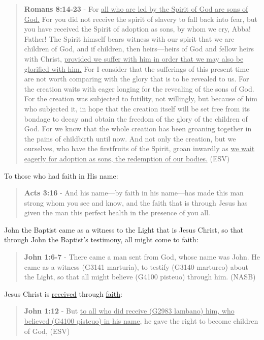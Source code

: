 \documentclass[11pt]{article}
\begin{document}
\begin{quote}
\textbf{Romans 8:14-23} - For \uline{all who are led by the Spirit of God are sons of God.} For you did not receive the spirit of slavery to fall back into fear, but you have received the Spirit of adoption as sons, by whom we cry, Abba! Father! The Spirit himself bears witness with our spirit that we are children of God, and if children, then heirs—heirs of God and fellow heirs with Christ, \uline{provided we suffer with him in order that we may also be glorified with him.} For I consider that the sufferings of this present time are not worth comparing with the glory that is to be revealed to us. For the creation waits with eager longing for the revealing of the sons of God. For the creation was subjected to futility, not willingly, but because of him who subjected it, in hope that the creation itself will be set free from its bondage to decay and obtain the freedom of the glory of the children of God. For we know that the whole creation has been groaning together in the pains of childbirth until now. And not only the creation, but we ourselves, who have the firstfruits of the Spirit, groan inwardly as \uline{we wait eagerly for adoption as sons, the redemption of our bodies.} (ESV)
\end{quote}

To those who had faith in His name:

\begin{quote}
\textbf{Acts 3:16} - And his name—by faith in his name—has made this man strong whom you see and know, and the faith that is through Jesus has given the man this perfect health in the presence of you all.
\end{quote}

John the Baptist came as a witness to the Light that is Jesus Christ, so that through John the Baptist's testimony, all might come to faith:

\begin{quote}
\textbf{John 1:6-7} - There came a man sent from God, whose name was John. He came as a witness (G3141 marturia), to testify (G3140 martureo) about the Light, so that all might believe (G4100 pisteuo) through him. (NASB)
\end{quote}

Jesus Christ is \uline{received} through \uline{faith}:

\begin{quote}
\textbf{John 1:12} - But \uline{to all who did receive (G2983 lambano) him, who believed (G4100 pisteuo) in his name,} he gave the right to become children of God, (ESV)
\end{quote}
\end{document}
